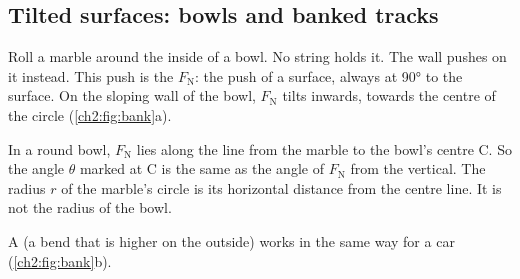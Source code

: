 \subsection*{Tilted surfaces: bowls and banked tracks}
Roll a marble around the inside of a bowl. No string holds it. The wall pushes on it
instead. This push is the  $F_\mathrm{N}$: the push of a surface, always at
\ang{90} to the surface. On the sloping wall of the bowl, $F_\mathrm{N}$ tilts inwards,
towards the centre of the circle (\cref{ch2:fig:bank}a).

In a round bowl, $F_\mathrm{N}$ lies along the line from the marble to the bowl's centre C.
So the angle $\theta$ marked at C is the same as the angle of $F_\mathrm{N}$ from the
vertical. The radius $r$ of the marble's circle is its horizontal distance from the centre
line. It is not the radius of the bowl.

A  (a bend that is higher on the outside) works in the same way for a car
(\cref{ch2:fig:bank}b).

